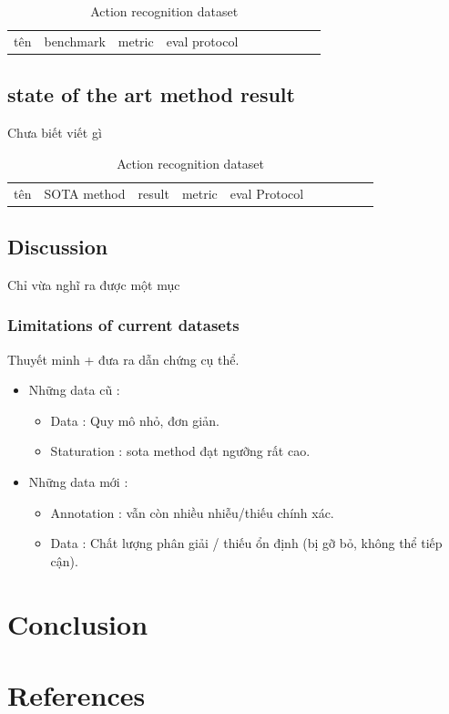 \documentclass[a4paper]{article}
\begin{document}
\begin{table}[h]
	\centering
	\caption{Action recognition dataset}
	\begin{tabular}{l|l l l l l l l l l}
		\toprule
		tên & benchmark & metric & eval protocol \\
	\end{tabular}%
	\label{config3}
\end{table}%

\subsection{state of the art method result}

Chưa biết viết gì

\begin{table}[h]
	\centering
	\caption{Action recognition dataset}
	\begin{tabular}{l|l l l l l l l l l}
		\toprule
		tên & SOTA method & result & metric & eval Protocol \\
	\end{tabular}%
	\label{config4}
\end{table}%

\subsection{Discussion}

Chỉ vừa nghĩ ra được một mục

\subsubsection{Limitations of current datasets}

Thuyết minh + đưa ra dẫn chứng cụ thể.

\begin{itemize}
	\item Những data cũ :
	\begin{itemize}
		\item Data : Quy mô nhỏ, đơn giản.
		\item Staturation : sota method đạt ngưỡng rất cao.
	\end{itemize}
	
	\item Những data mới :
	\begin{itemize}
		\item Annotation : vẫn còn nhiều nhiễu/thiếu chính xác.
		\item Data : Chất lượng phân giải / thiếu ổn định (bị gỡ bỏ, không thể tiếp cận).
	\end{itemize}
	
\end{itemize}

\section{Conclusion}

\section{References}



\end{document}
